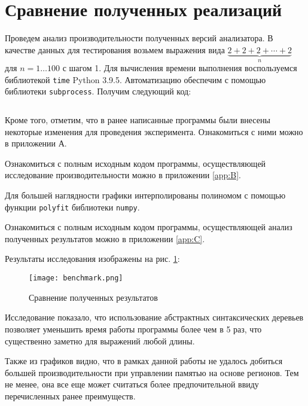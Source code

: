 \section{Сравнение полученных реализаций}
Проведем анализ производительности полученных версий анализатора. В качестве 
данных для тестирования возьмем выражения вида 
$\underbrace{2 + 2 + 2 + \cdots + 2}_{n}$ для $n = 1 \dots 100$ с шагом 1. Для 
вычисления времени выполнения воспользуемся библиотекой \texttt{time} 
Python 3.9.5. Автоматизацию обеспечим с помощью библиотеки \texttt{subprocess}. 
Получим следующий код:
\inputminted{python}{requirements/src/test.py}

Кроме того, отметим, что в ранее написанные программы были внесены некоторые 
изменения для проведения эксперимента. Ознакомиться с ними можно в приложении А.

Ознакомиться с полным исходным кодом программы, осуществляющей исследование 
производительности можно в приложении \ref{app:B}.

Для большей наглядности графики интерполированы полиномом с помощью функции 
\texttt{polyfit} библиотеки \texttt{numpy}.

Ознакомиться с полным исходным кодом программы, осуществляющей анализ полученных 
результатов можно в приложении \ref{app:C}.

Результаты исследования изображены на рис. \ref{img:benchmark}:
\begin{figure}[H]
    \centering
    \texttt{[image: benchmark.png]}
    \caption{Сравнение полученных результатов}
    \label{img:benchmark}
\end{figure} 
Исследование показало, что использование абстрактных синтаксических деревьев 
позволяет уменьшить время работы программы более чем в 5 раз, что существенно 
заметно для выражений любой длины.

Также из графиков видно, что в рамках данной работы не удалось добиться большей 
производительности при управлении памятью на основе регионов. Тем не менее, она 
все еще может считаться более предпочительной ввиду перечисленных ранее 
преимуществ.